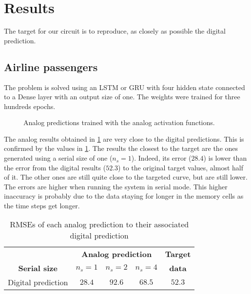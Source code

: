 \section{Results}

The target for our circuit is to reproduce, as closely as possible the digital prediction.

\subsection{Airline passengers}

The problem is solved using an LSTM or GRU with four hidden state connected to a Dense layer with an output size of one. The weights were trained for three hundreds epochs.

\begin{figure}[b]
  \centering
  
  \caption{Analog predictions trained with the analog activation functions.}
  \label{graph:airlineAnalog}
\end{figure}

The analog results obtained in \cref{graph:airlineAnalog} are very close to the digital predictions. This is confirmed by the values in \cref{tab:airlineAnalog}. The results the closest to the target are the ones generated using a serial size of one ($n_s=1$). Indeed, its error ($28.4$) is lower than the error from the digital results ($52.3$) to the original target values, almost half of it. The other ones are still quite close to the targeted curve, but are still lower. The errors are higher when running the system in serial mode. This higher inaccuracy is probably due to the data staying for longer in the memory cells as the time steps get longer.

\begin{table}[t]
  \caption{\acp{RMSE} of each analog prediction to their associated digital prediction}
  \label{tab:airlineAnalog}
  \centering
  \begin{tabular}{|c|c|c|c|c|}
    \cline{2-5}
    \multicolumn{1}{c}{}& \multicolumn{3}{|c|}{\textbf{Analog prediction}} &\textbf{Target}\\
    \cline{1-4}
    \textbf{Serial size} & \textbf{\textit{$n_s=1$}} & \textbf{\textit{$n_s=2$}} & \textbf{\textit{$n_s=4$}} & \textbf{data}\\
    \hline
    Digital prediction & $28.4$ & $92.6$ & $68.5$ & $52.3$\\
    \hline
  \end{tabular}
\end{table}

